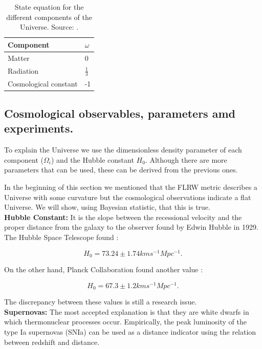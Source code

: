 \documentclass[onecolumn,           %
               showpacs,            %
               preprintnumbers,     %
               aps,                 %
               letterpaper,             %
               superscriptaddress,      %
               nofootinbib,         %
               tightenlines,        %
               floats,floatfix      %
               ,usenatbib,
               ]{revtex4-1}
\begin{document}
\begin{table} [htbp]
	\begin{center}
		\begin{tabular}{|l|l|}
			\hline
			Component & $\omega$\\
			\hline
			Matter & 0 \\
			\hline
			Radiation & $\frac{1}{3}$\\
			\hline
			Cosmological constant & -1 \\
			\hline
		\end{tabular}
		\caption{State equation for the different components of the Universe. Source: \cite{cambridge}.}
		\label{state}
	\end{center}
\end{table} 

\subsection{Cosmological observables, parameters amd experiments.}
To explain the Universe we use the dimensionless density parameter of each component ($\Omega_i$) and the Hubble constant $H_0$. Although there are more parameters that can be used, these can be derived from the previous ones.

In the beginning of this section we mentioned that the FLRW metric describes a Universe with some curvature but the cosmological observations indicate a flat Universe. We will show, using Bayesian statistic, that this is true.\\

\textbf{Hubble Constant:} It is the slope between the recessional velocity and the proper distance from the galaxy to the observer found by Edwin Hubble in 1929. The Hubble Space Telescope found \cite{hubble2016}:

\begin{equation}
H_0 = 73.24 \pm 1.74 kms^{-1} Mpc^{-1}.
\end{equation}

On the other hand, Planck Collaboration found another value \cite{planck}:

\begin{equation}
H_0 = 67.3 \pm 1.2 kms^{-1} Mpc^{-1}.
\end{equation}

The discrepancy between these values ​​is still a research issue.\\

\textbf{Supernovas:} The most accepted explanation is that they are white dwarfs in which thermonuclear processes occur. Empirically, the peak luminosity of the type Ia supernovas (SNIa) can be used as a distance indicator using the relation between redshift and distance\cite{parametros}. 
\end{document}
